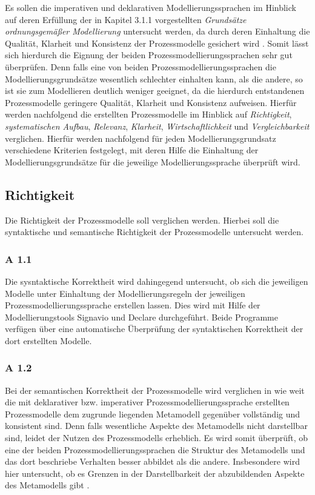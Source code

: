 Es sollen die imperativen und deklarativen Modellierungssprachen im Hinblick auf deren Erfüllung der in Kapitel 3.1.1 vorgestellten \textit{Grundsätze ordnungsgemäßer Modellierung} untersucht werden, da durch deren Einhaltung die Qualität, Klarheit und Konsistenz der Prozessmodelle gesichert wird \cite{freund2007}. Somit lässt sich hierdurch die Eignung der beiden Prozessmodellierungssprachen sehr gut überprüfen. Denn falls eine von beiden Prozessmodellierungssprachen die Modellierungsgrundsätze wesentlich schlechter einhalten kann, als die andere, so ist sie zum Modellieren deutlich weniger geeignet, da die hierdurch entstandenen Prozessmodelle geringere Qualität, Klarheit und Konsistenz aufweisen. Hierfür werden nachfolgend die erstellten Prozessmodelle im Hinblick auf \textit{Richtigkeit}, \textit{systematischen Aufbau}, \textit{Relevanz}, \textit{Klarheit}, \textit{Wirtschaftlichkeit} und \textit{Vergleichbarkeit} verglichen. Hierfür werden nachfolgend für jeden Modellierungsgrundsatz verschiedene Kriterien festgelegt, mit deren Hilfe die Einhaltung der Modellierungsgrundsätze für die jeweilige Modellierungssprache überprüft wird. \newline

\subsection{Richtigkeit}
Die Richtigkeit der Prozessmodelle soll verglichen werden. Hierbei soll die syntaktische und semantische Richtigkeit der Prozessmodelle untersucht werden. \newline


\subsubsection{A 1.1}

Die sysntaktische Korrektheit wird dahingegend untersucht, ob sich die jeweiligen Modelle unter Einhaltung der Modellierungsregeln der jeweiligen Prozessmodellierungssprache erstellen lassen. Dies wird mit Hilfe der Modellierungstools Signavio und Declare durchgeführt. Beide Programme verfügen über eine automatische Überprüfung der syntaktischen Korrektheit der dort erstellten Modelle. \newline

\subsubsection{A 1.2}

Bei der semantischen Korrektheit der Prozessmodelle wird verglichen in wie weit die mit deklarativer bzw. imperativer Prozessmodellierungssprache erstellten Prozessmodelle dem zugrunde liegenden Metamodell gegenüber vollständig und konsistent sind. Denn falls wesentliche Aspekte des Metamodells nicht darstellbar sind, leidet der Nutzen des Prozessmodells erheblich. Es wird somit überprüft, ob eine der beiden Prozessmodellierungssprachen die Struktur des Metamodells und das dort beschriebe Verhalten besser abbildet als die andere. Insbesondere wird hier untersucht, ob es Grenzen in der Darstellbarkeit der abzubildenden Aspekte des Metamodells gibt \cite{journals95, becker2012prozessmanagement}. \newline


